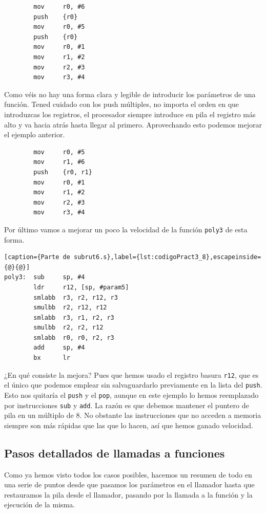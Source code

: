 \begin{lstlisting}
        mov     r0, #6
        push    {r0}
        mov     r0, #5
        push    {r0}
        mov     r0, #1
        mov     r1, #2
        mov     r2, #3
        mov     r3, #4
\end{lstlisting}

Como véis no hay una forma clara y legible de introducir los parámetros
de una función. Tened cuidado con los push múltiples, no importa el orden
en que introduzcas los registros, el procesador siempre introduce en pila
el registro más alto y va hacia atrás hasta llegar al primero. Aprovechando
esto podemos mejorar el ejemplo anterior.

\begin{lstlisting}
        mov     r0, #5
        mov     r1, #6
        push    {r0, r1}
        mov     r0, #1
        mov     r1, #2
        mov     r2, #3
        mov     r3, #4
\end{lstlisting}

Por último vamos a mejorar un poco la velocidad de la función {\tt poly3} de
esta forma.

\begin{lstlisting}[caption={Parte de subrut6.s},label={lst:codigoPract3_8},escapeinside={@}{@}]
poly3:  sub     sp, #4
        ldr     r12, [sp, #param5]
        smlabb  r3, r2, r12, r3
        smulbb  r2, r12, r12
        smlabb  r3, r1, r2, r3
        smulbb  r2, r2, r12
        smlabb  r0, r0, r2, r3
        add     sp, #4
        bx      lr
\end{lstlisting}

¿En qué consiste la mejora? Pues que hemos usado el registro basura {\tt r12}, que
es el único que podemos emplear sin salvaguardarlo previamente en la lista del {\tt push}.
Esto nos quitaría el {\tt push} y el {\tt pop}, aunque en este ejemplo lo hemos
reemplazado por instrucciones {\tt sub} y {\tt add}. La razón es que debemos mantener
el puntero de pila en un múltiplo de 8. No obstante las instrucciones que no acceden
a memoria siempre son más rápidas que las que lo hacen, así que hemos ganado velocidad.

\subsection{Pasos detallados de llamadas a funciones}

Como ya hemos visto todos los casos posibles, hacemos un resumen de todo en una
serie de puntos desde que pasamos los parámetros en el llamador hasta que restauramos
la pila desde el llamador, pasando por la llamada a la función y la ejecución de la misma.

